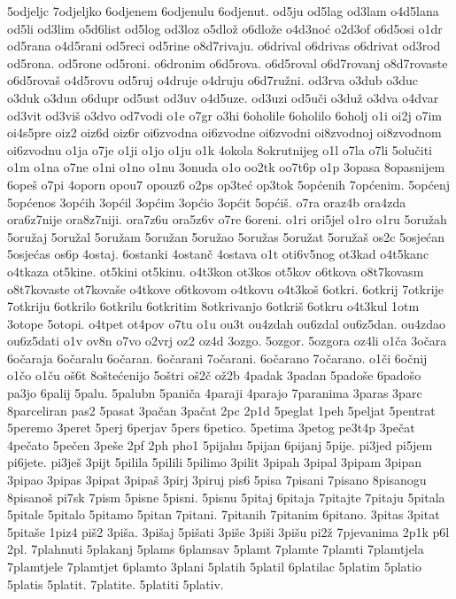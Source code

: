{5odjeljc
7odjeljko
6odjenem
6odjenulu
6odjenut.
od5ju
od5lag
od3lam
o4d5lana
od5li
od3lim
o5d6list
od5log
od3loz
o5dlož
o6dlože
o4d3noć
o2d3of
o6d5osi
o1dr
od5rana
o4d5rani
od5reci
od5rine
o8d7rivaju.
o6drival
o6drivas
o6drivat
od3rod
od5rona.
od5rone
od5roni.
o6dronim
o6d5rova.
o6d5roval
o6d7rovanj
o8d7rovaste
o6d5rovaš
o4d5rovu
od5ruj
o4druje
o4druju
o6d7ružni.
od3rva
o3dub
o3duc
o3duk
o3dun
o6dupr
od5ust
od3uv
o4d5uze.
od3uzi
od5uči
o3duž
o3dva
o4dvar
od3vit
od3viš
o3dvo
od7vodi
o1e
o7gr
o3hi
6oholile
6oholilo
6oholj
o1i
oi2j
o7im
oi4s5pre
oiz2
oiz6d
oiz6r
oi6zvodna
oi6zvodne
oi6zvodni
oi8zvodnoj
oi8zvodnom
oi6zvodnu
o1ja
o7je
o1ji
o1jo
o1ju
o1k
4okola
8okrutnijeg
o1l
o7la
o7li
5olučiti
o1m
o1na
o7ne
o1ni
o1no
o1nu
3onuda
o1o
oo2tk
oo7t6p
o1p
3opasa
8opasnijem
6opeš
o7pi
4oporn
opou7
opouz6
o2ps
op3teć
op3tok
5općenih
7općenim.
5općenj
5općenos
3općih
3općil
3općim
3općio
3općit
5općiš.
o7ra
oraz4b
ora4zda
ora6z7nije
ora8z7niji.
ora7z6u
ora5z6v
o7re
6oreni.
o1ri
ori5jel
o1ro
o1ru
5oružah
5oružaj
5oružal
5oružam
5oružan
5oružao
5oružas
5oružat
5oružaš
os2c
5osjećan
5osjećas
os6p
4ostaj.
6ostanki
4ostanč
4ostava
o1t
oti6v5nog
ot3kad
o4t5kanc
o4tkaza
ot5kine.
ot5kini
ot5kinu.
o4t3kon
ot3kos
ot5kov
o6tkova
o8t7kovasm
o8t7kovaste
ot7kovaše
o4tkove
o6tkovom
o4tkovu
o4t3koš
6otkri.
6otkrij
7otkrije
7otkriju
6otkrilo
6otkrilu
6otkritim
8otkrivanjo
6otkriš
6otkru
o4t3kul
1otm
3otope
5otopi.
o4tpet
ot4pov
o7tu
o1u
ou3t
ou4zdah
ou6zdal
ou6z5dan.
ou4zdao
ou6z5dati
o1v
ov8n
o7vo
o2vrj
oz2
oz4d
3ozgo.
5ozgor.
5ozgora
oz4li
o1ča
3očara
6očaraja
6očaralu
6očaran.
6očarani
7očarani.
6očarano
7očarano.
o1či
6očnij
o1čo
o1ču
oš6t
8oštećenijo
5oštri
oš2č
ož2b
4padak
3padan
5padoše
6padošo
pa3jo
6palij
5palu.
5palubn
5paniča
4paraji
4parajo
7paranima
3paras
3parc
8parceliran
pas2
5pasat
3pačan
3pačat
2pc
2p1d
5peglat
1peh
5peljat
5pentrat
5peremo
3peret
5perj
6perjav
5pers
6petico.
5petima
3petog
pe3t4p
3pečat
4pečato
5pečen
3peše
2pf
2ph
pho1
5pijahu
5pijan
6pijanj
5pije.
pi3jed
pi5jem
pi6jete.
pi3ješ
3pijt
5pilila
5pilili
5pilimo
3pilit
3pipah
3pipal
3pipam
3pipan
3pipao
3pipas
3pipat
3pipaš
3pirj
3piruj
pis6
5pisa
7pisani
7pisano
8pisanogu
8pisanoš
pi7sk
7pism
5pisne
5pisni.
5pisnu
5pitaj
6pitaja
7pitajte
7pitaju
5pitala
5pitale
5pitalo
5pitamo
5pitan
7pitani.
7pitanih
7pitanim
6pitano.
3pitas
3pitat
5pitaše
1piz4
piš2
3piša.
3pišaj
5pišati
3piše
3piši
3pišu
pi2ž
7pjevanima
2p1k
p6l
2pl.
7plahnuti
5plakanj
5plams
6plamsav
5plamt
7plamte
7plamti
7plamtjela
7plamtjele
7plamtjet
6plamto
3plani
5platih
5platil
6platilac
5platim
5platio
5platis
5platit.
7platite.
5platiti
5plativ.
}

